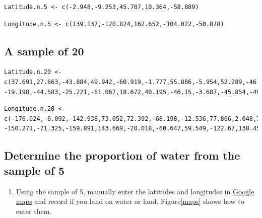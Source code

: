 \documentclass[letterpaper,12pt,twoside,]{pinp}
\providecommand{\tightlist}{%
  \setlength{\itemsep}{0pt}\setlength{\parskip}{0pt}}
\begin{document}
\begin{ShadedResult}
\begin{verbatim}
Latitude.n.5 <- c(-2.948,-9.253,45.707,10.364,-58.889)
\end{verbatim}
\end{ShadedResult}
\begin{ShadedResult}
\begin{verbatim}
Longitude.n.5 <- c(139.137,-120.824,162.652,-104.022,-50.878)
\end{verbatim}
\end{ShadedResult}

\hypertarget{a-sample-of-20}{%
\subsection*{A sample of 20}\label{a-sample-of-20}}

\begin{ShadedResult}
\begin{verbatim}
Latitude.n.20 <- c(37.691,27.663,-43.884,49.942,-60.919,-1.777,55.886,-5.954,52.289,-46.256,
-19.198,-44.583,-25.221,-61.067,18.672,40.195,-46.15,-3.687,-45.854,-49.987)
\end{verbatim}
\end{ShadedResult}
\begin{ShadedResult}
\begin{verbatim}
Longitude.n.20 <- c(-176.024,-6.092,-142.938,73.052,72.392,-68.198,-12.536,77.866,2.048,70.171,
-150.271,-71.325,-159.891,143.669,-20.018,-60.647,59.549,-122.67,138.459,57.433)
\end{verbatim}
\end{ShadedResult}

\hypertarget{determine-the-proportion-of-water-from-the-sample-of-5}{%
\subsection{Determine the proportion of water from the sample of
5}\label{determine-the-proportion-of-water-from-the-sample-of-5}}

\begin{enumerate}
\def\labelenumi{\arabic{enumi}.}
\tightlist
\item
  Using the sample of 5, manually enter the latitudes and longitudes in
  \href{https://www.google.com/maps}{Google maps} and record if you land
  on water or land. Figure\ref{maps} shows how to enter them.
\end{enumerate}
\end{document}

